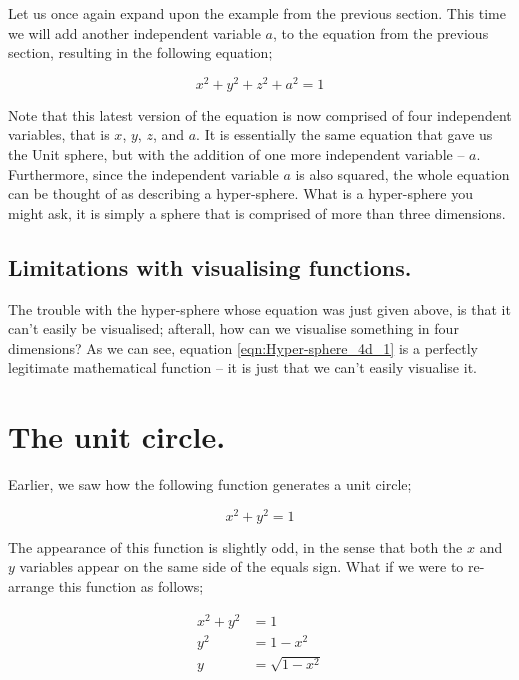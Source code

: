 \documentclass{article}
\begin{document}
Let us once again expand upon the example from the previous section. This time we will add another independent
variable $a$, to the equation from the previous section, resulting in the following equation;

\begin{equation}
\label{eqn:Hyper-sphere_4d_1}
x^{2} + y^{2} + z^{2} + a^{2} = 1
\end{equation}

Note that this latest version of the equation is now comprised of four independent variables, that is $x$, $y$, $z$, 
and $a$. It is essentially the same equation that gave us the Unit sphere, but with the addition of one more
independent variable -- $a$. Furthermore, since the independent variable $a$ is also squared, the whole equation
can be thought of as describing a hyper-sphere. What is a hyper-sphere you might ask, it is simply a sphere that
is comprised of more than three dimensions.\\


\subsection{Limitations with visualising functions.}

The trouble with the hyper-sphere whose equation was just given above, is that it can't easily be visualised; afterall,
how can we visualise something in four dimensions? As we can see, equation \ref{eqn:Hyper-sphere_4d_1} is a
perfectly legitimate mathematical function -- it is just that we can't easily visualise it.


\section{The unit circle.}

Earlier, we saw how the following function generates a unit circle;

\begin{equation*}
x^2 + y^2 = 1
\end{equation*}

The appearance of this function is slightly odd, in the sense that both the $x$ and $y$ variables appear on
the same side of the equals sign. What if we were to re-arrange this function as follows;

\begin{align*}
x^2 + y^2 &= 1 \\
y^2 &= 1 - x^2 \\
y &= \sqrt{1 - x^{2}}
\end{align*}
\end{document}
